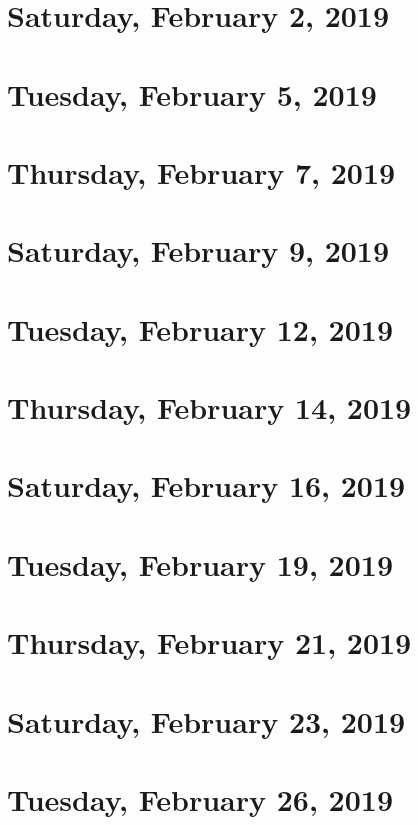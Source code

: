 \documentclass[reqno]{amsart}
\begin{document}
\section{Saturday, February 2, 2019}
    
    
\section{Tuesday, February 5, 2019}
    

\section{Thursday, February 7, 2019}
    

\section{Saturday, February 9, 2019}
    
    
\section{Tuesday, February 12, 2019}
    

\section{Thursday, February 14, 2019}
    

\section{Saturday, February 16, 2019}
    

\section{Tuesday, February 19, 2019}
    

\section{Thursday, February 21, 2019}
    

\section{Saturday, February 23, 2019}
    

\section{Tuesday, February 26, 2019}
    
\end{document}
